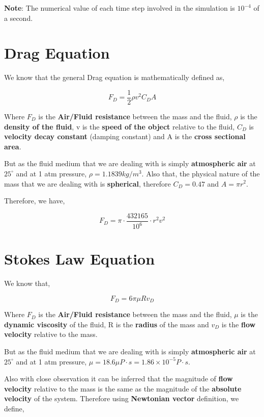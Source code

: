 	{\textbf{Note}: The numerical value of each time step involved in the simulation is $10^{-4}$ of a second.}
           
\section{{Drag Equation}}
            
    {We know that the general Drag equation is mathematically defined as,}
            
        $$F_D = \frac{1}{2}\rho v^2C_DA$$
           
    {Where $F_D$ is the \textbf{Air/Fluid resistance} between the mass and the fluid, $\rho$ is the \textbf{density of the fluid}, v is the \textbf{speed of the object} relative to the fluid, $C_D$ is \textbf{velocity decay constant} (damping constant) and A is the \textbf{cross sectional area}.}
            
    {But as the fluid medium that we are dealing with is simply \textbf{atmospheric air} at $25^\circ$ and at 1 atm pressure, $\rho = 1.1839 kg/m^3$. Also that, the physical nature of the mass that we are dealing with is \textbf{spherical}, therefore $C_D = 0.47$ and $A = \pi r^2$.}
            
    {Therefore, we have,}
            
        $$F_D = \pi\cdot\frac{432165}{10^{6}}\cdot r^2v^2$$
            
\section{{Stokes Law Equation}}
            
    {We know that,}
            
        $$F_D = 6\pi\mu Rv_D$$
            
    {Where $F_D$ is the \textbf{Air/Fluid resistance} between the mass and the fluid, $\mu$ is the \textbf{dynamic viscosity} of the fluid, R is the \textbf{radius} of the mass and $v_D$ is the \textbf{flow velocity} relative to the mass.}
            
    {But as the fluid medium that we are dealing with is simply \textbf{atmospheric air} at $25^\circ$ and at 1 atm pressure, $\mu = 18.6 \mu P\cdot s = 1.86 \times 10^{-5} P\cdot s$.}
            
    {Also with close observation it can be inferred that the magnitude of \textbf{flow velocity} relative to the mass is the same as the magnitude of the \textbf{absolute velocity} of the system. Therefore using \textbf{Newtonian vector} definition, we define,}
            

